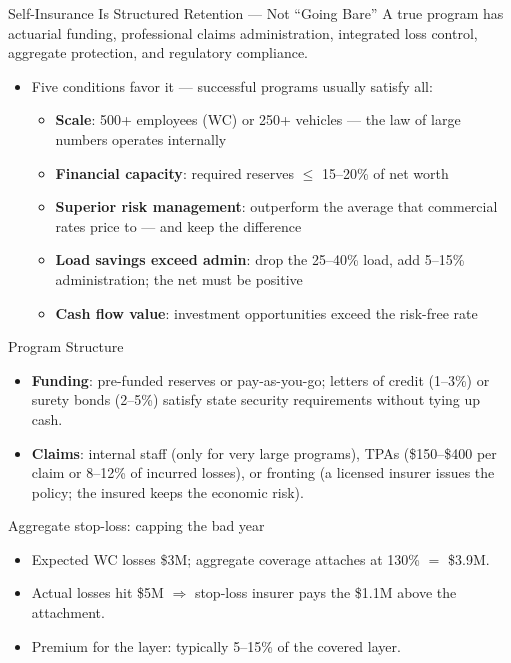 \documentclass[11pt, aspectratio=169]{beamer}
\begin{document}
\begin{frame}{Self-Insurance Is Structured Retention --- Not ``Going Bare''}
A true program has actuarial funding, professional claims administration, integrated loss control, aggregate protection, and regulatory compliance.
\medskip
\begin{itemize}
  \item Five conditions favor it --- successful programs usually satisfy all:
  \begin{itemize}
    \item \textbf{Scale}: 500+ employees (WC) or 250+ vehicles --- the law of large numbers operates internally
    \item \textbf{Financial capacity}: required reserves $\le$ 15--20\% of net worth
    \item \textbf{Superior risk management}: outperform the average that commercial rates price to --- and keep the difference
    \item \textbf{Load savings exceed admin}: drop the 25--40\% load, add 5--15\% administration; the net must be positive
    \item \textbf{Cash flow value}: investment opportunities exceed the risk-free rate
  \end{itemize}
\end{itemize}
\end{frame}

\begin{frame}{Program Structure}
\begin{itemize}
  \item \textbf{Funding}: pre-funded reserves or pay-as-you-go; letters of credit (1--3\%) or surety bonds (2--5\%) satisfy state security requirements without tying up cash.
  \item \textbf{Claims}: internal staff (only for very large programs), \alert{TPAs} (\$150--\$400 per claim or 8--12\% of incurred losses), or \alert{fronting} (a licensed insurer issues the policy; the insured keeps the economic risk).
\end{itemize}
\begin{exampleblock}{Aggregate stop-loss: capping the bad year}
\begin{itemize}
  \item Expected WC losses \$3M; aggregate coverage attaches at 130\% $=$ \$3.9M.
  \item Actual losses hit \$5M $\Rightarrow$ stop-loss insurer pays the \$1.1M above the attachment.
  \item Premium for the layer: typically 5--15\% of the covered layer.
\end{itemize}
\end{exampleblock}
\end{frame}
\end{document}
